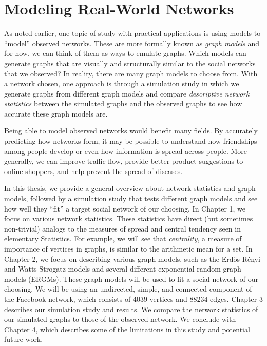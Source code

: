 \documentclass[12pt,twoside]{amherstthesis}
\begin{document}
  \section{Modeling Real-World
  Networks}\label{modeling-real-world-networks}
  
  As noted earlier, one topic of study with practical applications is
  using models to ``model'' observed networks. These are more formally
  known as \emph{graph models} and for now, we can think of them as ways
  to emulate graphs. Which models can generate graphs that are visually
  and structurally similar to the social networks that we observed? In
  reality, there are many graph models to choose from. With a network
  chosen, one approach is through a simulation study in which we generate
  graphs from different graph models and compare \emph{descriptive network
  statistics} between the simulated graphs and the observed graphs to see
  how accurate these graph models are.
  
  Being able to model observed networks would benefit many fields. By
  accurately predicting how networks form, it may be possible to
  understand how friendships among people develop or even how information
  is spread across people. More generally, we can improve traffic flow,
  provide better product suggestions to online shoppers, and help prevent
  the spread of diseases.
  
  In this thesis, we provide a general overview about network statistics
  and graph models, followed by a simulation study that tests different
  graph models and see how well they ``fit'' a target social network of
  our choosing. In Chapter 1, we focus on various network statistics.
  These statistics have direct (but sometimes non-trivial) analogs to the
  measures of spread and central tendency seen in elementary Statistics.
  For example, we will see that \emph{centrality}, a measure of importance
  of vertices in graphs, is similar to the arithmetic mean for a set. In
  Chapter 2, we focus on describing various graph models, such as the
  Erdős-Rényi and Watts-Strogatz models and several different exponential
  random graph models (ERGMs). These graph models will be used to fit a
  social network of our choosing. We will be using an undirected, simple,
  and connected component of the Facebook network, which consists of
  \(4039\) vertices and \(88234\) edges. Chapter 3 describes our
  simulation study and results. We compare the network statistics of our
  simulated graphs to those of the observed network. We conclude with
  Chapter 4, which describes some of the limitations in this study and
  potential future work.
  
\end{document}
